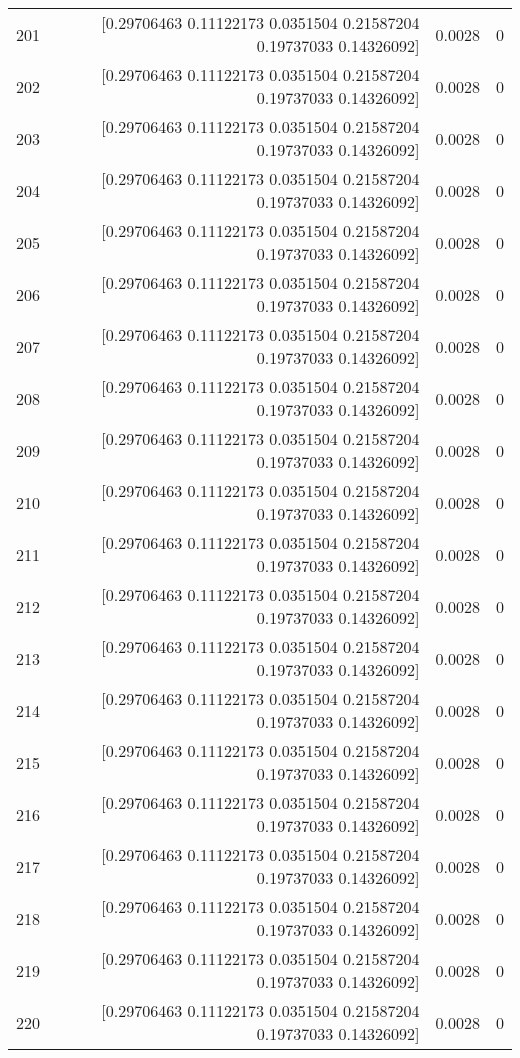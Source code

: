 \begin{longtable}{lrrr}
201 & [0.29706463 0.11122173 0.0351504  0.21587204 0.19737033 0.14326092] & 0.0028 & 0 \\
202 & [0.29706463 0.11122173 0.0351504  0.21587204 0.19737033 0.14326092] & 0.0028 & 0 \\
203 & [0.29706463 0.11122173 0.0351504  0.21587204 0.19737033 0.14326092] & 0.0028 & 0 \\
204 & [0.29706463 0.11122173 0.0351504  0.21587204 0.19737033 0.14326092] & 0.0028 & 0 \\
205 & [0.29706463 0.11122173 0.0351504  0.21587204 0.19737033 0.14326092] & 0.0028 & 0 \\
206 & [0.29706463 0.11122173 0.0351504  0.21587204 0.19737033 0.14326092] & 0.0028 & 0 \\
207 & [0.29706463 0.11122173 0.0351504  0.21587204 0.19737033 0.14326092] & 0.0028 & 0 \\
208 & [0.29706463 0.11122173 0.0351504  0.21587204 0.19737033 0.14326092] & 0.0028 & 0 \\
209 & [0.29706463 0.11122173 0.0351504  0.21587204 0.19737033 0.14326092] & 0.0028 & 0 \\
210 & [0.29706463 0.11122173 0.0351504  0.21587204 0.19737033 0.14326092] & 0.0028 & 0 \\
211 & [0.29706463 0.11122173 0.0351504  0.21587204 0.19737033 0.14326092] & 0.0028 & 0 \\
212 & [0.29706463 0.11122173 0.0351504  0.21587204 0.19737033 0.14326092] & 0.0028 & 0 \\
213 & [0.29706463 0.11122173 0.0351504  0.21587204 0.19737033 0.14326092] & 0.0028 & 0 \\
214 & [0.29706463 0.11122173 0.0351504  0.21587204 0.19737033 0.14326092] & 0.0028 & 0 \\
215 & [0.29706463 0.11122173 0.0351504  0.21587204 0.19737033 0.14326092] & 0.0028 & 0 \\
216 & [0.29706463 0.11122173 0.0351504  0.21587204 0.19737033 0.14326092] & 0.0028 & 0 \\
217 & [0.29706463 0.11122173 0.0351504  0.21587204 0.19737033 0.14326092] & 0.0028 & 0 \\
218 & [0.29706463 0.11122173 0.0351504  0.21587204 0.19737033 0.14326092] & 0.0028 & 0 \\
219 & [0.29706463 0.11122173 0.0351504  0.21587204 0.19737033 0.14326092] & 0.0028 & 0 \\
220 & [0.29706463 0.11122173 0.0351504  0.21587204 0.19737033 0.14326092] & 0.0028 & 0 \\

\end{longtable}
